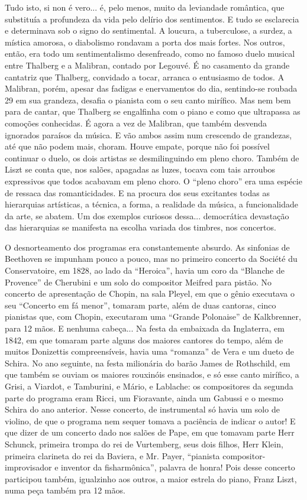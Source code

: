 Tudo isto, si non é vero... é, pelo menos, muito da leviandade
romântica, que substituía a profundeza da vida pelo delírio dos
sentimentos. E tudo se esclarecia e determinava sob o signo do
sentimental. A loucura, a tuberculose, a surdez, a mística amorosa, o
diabolismo rondavam a porta dos mais fortes. Nos outros, então, era todo
um sentimentalismo desenfreado, como no famoso duelo musical entre
Thalberg e a Malibran, contado por Legouvé. É no casamento da grande
cantatriz que Thalberg, convidado a tocar, arranca o entusiasmo de
todos. A Malibran, porém, apesar das fadigas e enervamentos do dia,
sentindo-se roubada 29 em sua grandeza, desafia o pianista com o seu
canto mirífico. Mas nem bem para de cantar, que Thalberg se engalfinha
com o piano e como que ultrapassa as comoções conhecidas. É agora a vez
de Malibran, que também desvenda ignorados paraísos da música. E vão
ambos assim num crescendo de grandezas, até que não podem mais, choram.
Houve empate, porque não foi possível continuar o duelo, os dois
artistas se desmilinguindo em pleno choro. Também de Liszt se conta que,
nos salões, apagadas as luzes, tocava com tais arroubos expressivos que
todos acabavam em pleno choro. O ``pleno choro'' era uma espécie de
ressaca das romanticidades. E na procura dos seus excitantes todas as
hierarquias artísticas, a técnica, a forma, a realidade da música, a
funcionalidade da arte, se abatem. Um dos exemplos curiosos dessa...
democrática devastação das hierarquias se manifesta na escolha variada
dos timbres, nos concertos.

O desnorteamento dos programas era constantemente absurdo. As sinfonias
de Beethoven se impunham pouco a pouco, mas no primeiro concerto da
Société du Conservatoire, em 1828, ao lado da ``Heroica'', havia um coro
da ``Blanche de Provence'' de Cherubini e um solo do compositor Meifred
para pistão. No concerto de apresentação de Chopin, na sala Pleyel, em
que o gênio executava o seu ``Concerto em fá menor'', tomaram parte,
além de duas cantoras, cinco pianistas que, com Chopin, executaram uma
``Grande Polonaise'' de Kalkbrenner, para 12 mãos. E nenhuma cabeça...
Na festa da embaixada da Inglaterra, em 1842, em que tomaram parte
alguns dos maiores cantores do tempo, além de muitos Donizettis
compreensíveis, havia uma ``romanza'' de Vera e um dueto de Schira. No
ano seguinte, na festa milionária do barão James de Rothschild, em que
também se ouviam os maiores rouxinóis ensinados, e só esse canto
mirífico, a Grisi, a Viardot, e Tamburini, e Mário, e Lablache: os
compositores da segunda parte do programa eram Ricci, um Fioravante,
ainda um Gabussi e o mesmo Schira do ano anterior. Nesse concerto, de
instrumental só havia um solo de violino, de que o programa nem sequer
tomava a paciência de indicar o autor! E que dizer de um concerto dado
nos salões de Pape, em que tomavam parte Herr Schunck, primeira trompa
do rei de Vurtemberg, seus dois filhos, Herr Klein, primeira clarineta
do rei da Baviera, e Mr. Payer, ``pianista compositor-improvisador e
inventor da fisharmônica'', palavra de honra! Pois desse concerto
participou também, igualzinho aos outros, a maior estrela do piano,
Franz Liszt, numa peça também pra 12 mãos.

